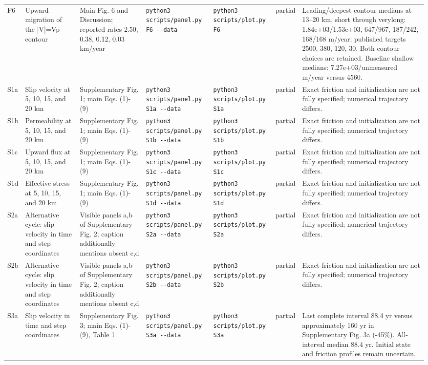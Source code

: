 \documentclass[11pt]{article}
\begin{document}
\begin{landscape}
\begin{longtable}{P{10mm}P{30mm}P{34mm}P{39mm}P{32mm}P{23mm}P{65mm}}
F6 & Upward migration of the |V|=Vp contour & Main Fig. 6 and Discussion; reported rates 2.50, 0.38, 0.12, 0.03 km/year & \texttt{python3 scripts/panel.py F6 -{}-data} & \texttt{python3 scripts/plot.py F6} & partial & Leading/deepest contour medians at 13--20 km, short through verylong: 1.84e+03/1.53e+03, 647/967, 187/242, 168/168 m/year; published targets 2500, 380, 120, 30. Both contour choices are retained. Baseline shallow medians: 7.27e+03/unmeasured m/year versus 4560.\\[5pt]
S1a & Slip velocity at 5, 10, 15, and 20 km & Supplementary Fig. 1; main Eqs. (1)-(9) & \texttt{python3 scripts/panel.py S1a -{}-data} & \texttt{python3 scripts/plot.py S1a} & partial & Exact friction and initialization are not fully specified; numerical trajectory differs.\\[5pt]
S1b & Permeability at 5, 10, 15, and 20 km & Supplementary Fig. 1; main Eqs. (1)-(9) & \texttt{python3 scripts/panel.py S1b -{}-data} & \texttt{python3 scripts/plot.py S1b} & partial & Exact friction and initialization are not fully specified; numerical trajectory differs.\\[5pt]
S1c & Upward flux at 5, 10, 15, and 20 km & Supplementary Fig. 1; main Eqs. (1)-(9) & \texttt{python3 scripts/panel.py S1c -{}-data} & \texttt{python3 scripts/plot.py S1c} & partial & Exact friction and initialization are not fully specified; numerical trajectory differs.\\[5pt]
S1d & Effective stress at 5, 10, 15, and 20 km & Supplementary Fig. 1; main Eqs. (1)-(9) & \texttt{python3 scripts/panel.py S1d -{}-data} & \texttt{python3 scripts/plot.py S1d} & partial & Exact friction and initialization are not fully specified; numerical trajectory differs.\\[5pt]
S2a & Alternative cycle: slip velocity in time and step coordinates & Visible panels a,b of Supplementary Fig. 2; caption additionally mentions absent c,d & \texttt{python3 scripts/panel.py S2a -{}-data} & \texttt{python3 scripts/plot.py S2a} & partial & Exact friction and initialization are not fully specified; numerical trajectory differs.\\[5pt]
S2b & Alternative cycle: slip velocity in time and step coordinates & Visible panels a,b of Supplementary Fig. 2; caption additionally mentions absent c,d & \texttt{python3 scripts/panel.py S2b -{}-data} & \texttt{python3 scripts/plot.py S2b} & partial & Exact friction and initialization are not fully specified; numerical trajectory differs.\\[5pt]
S3a & Slip velocity in time and step coordinates & Supplementary Fig. 3; main Eqs. (1)-(9), Table 1 & \texttt{python3 scripts/panel.py S3a -{}-data} & \texttt{python3 scripts/plot.py S3a} & partial & Last complete interval 88.4 yr versus approximately 160 yr in Supplementary Fig. 3a (-45\%). All-interval median 88.4 yr. Initial state and friction profiles remain uncertain.\\[5pt]

\end{longtable}
\end{landscape}
\end{document}
